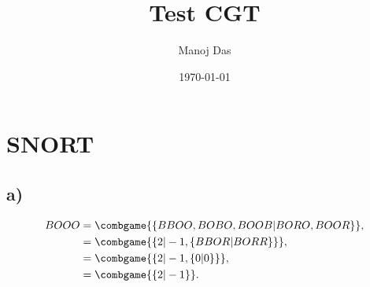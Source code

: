 \documentclass[11pt,twoside]{article}
\title{Test CGT}
\author{Manoj Das}
\date{\today}
\begin{document}
\maketitle
\section{SNORT}
\subsection{a)}
\begin{align*}
    BOOO &= \combgame{\{BBOO,BOBO,BOOB|BORO,BOOR\}}, \\
    &= \combgame{\{2|-1,\{BBOR|BORR\}\}}, \\
    &= \combgame{\{2|-1,\{0|0\}\}}, \\
    &= \combgame{\{2|-1\}}.
\end{align*}
\end{document}
